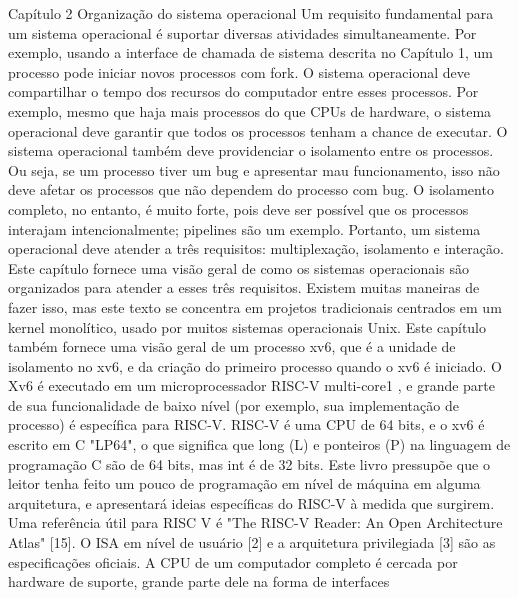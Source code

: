 Capítulo  2
 Organização  do  sistema  operacional
 Um  requisito  fundamental  para  um  sistema  operacional  é  suportar  diversas  atividades  simultaneamente.  Por  exemplo,  
usando  a  interface  de  chamada  de  sistema  descrita  no  Capítulo  1,  um  processo  pode  iniciar  novos  processos  com  fork.
 O  sistema  operacional  deve  compartilhar  o  tempo  dos  recursos  do  computador  entre  esses  processos.  Por  exemplo,  
mesmo  que  haja  mais  processos  do  que  CPUs  de  hardware,  o  sistema  operacional  deve  garantir  que  todos  os  processos  
tenham  a  chance  de  executar.  O  sistema  operacional  também  deve  providenciar  o  isolamento  entre  os  processos.  Ou  
seja,  se  um  processo  tiver  um  bug  e  apresentar  mau  funcionamento,  isso  não  deve  afetar  os  processos  que  não  dependem  
do  processo  com  bug.  O  isolamento  completo,  no  entanto,  é  muito  forte,  pois  deve  ser  possível  que  os  processos  interajam  
intencionalmente;  pipelines  são  um  exemplo.  Portanto,  um  sistema  operacional  deve  atender  a  três  requisitos:  
multiplexação,  isolamento  e  interação.
 Este  capítulo  fornece  uma  visão  geral  de  como  os  sistemas  operacionais  são  organizados  para  atender  a  esses  
três  requisitos.  Existem  muitas  maneiras  de  fazer  isso,  mas  este  texto  se  concentra  em  projetos  tradicionais  centrados  
em  um  kernel  monolítico,  usado  por  muitos  sistemas  operacionais  Unix.  Este  capítulo  também  fornece  uma  visão  geral  
de  um  processo  xv6,  que  é  a  unidade  de  isolamento  no  xv6,  e  da  criação  do  primeiro  processo  quando  o  xv6  é  iniciado.
 O  Xv6  é  executado  em  um  microprocessador  RISC-V  multi-core1 ,  e  grande  parte  de  sua  funcionalidade  de  baixo  
nível  (por  exemplo,  sua  implementação  de  processo)  é  específica  para  RISC-V.  RISC-V  é  uma  CPU  de  64  bits,  e  o  xv6  
é  escrito  em  C  "LP64",  o  que  significa  que  long  (L)  e  ponteiros  (P)  na  linguagem  de  programação  C  são  de  64  bits,  mas  
int  é  de  32  bits.  Este  livro  pressupõe  que  o  leitor  tenha  feito  um  pouco  de  programação  em  nível  de  máquina  em  
alguma  arquitetura,  e  apresentará  ideias  específicas  do  RISC-V  à  medida  que  surgirem.  Uma  referência  útil  para  RISC
V  é  "The  RISC-V  Reader:  An  Open  Architecture  Atlas"  [15].  O  ISA  em  nível  de  usuário  [2]  e  a  arquitetura  privilegiada  
[3]  são  as  especificações  oficiais.
 A  CPU  de  um  computador  completo  é  cercada  por  hardware  de  suporte,  grande  parte  dele  na  forma  de  interfaces  
